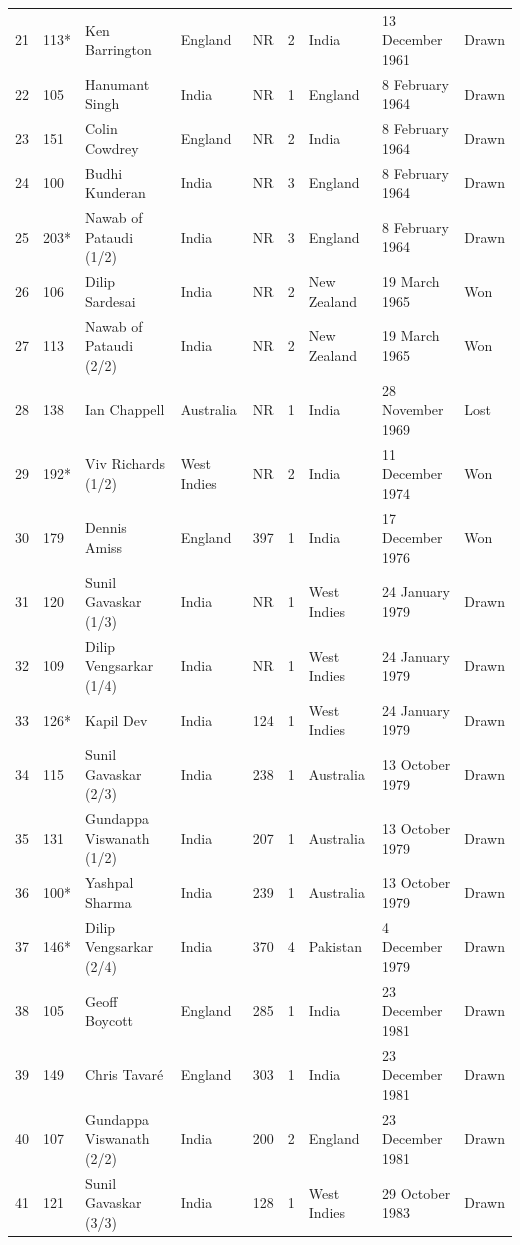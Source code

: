 \documentclass{article}
\begin{document}
\begin{tabular}{lllllllll}
21 & 113* & Ken Barrington & England & NR & 2 & India & 13 December 1961 & Drawn \\
22 & 105 & Hanumant Singh & India & NR & 1 & England & 8 February 1964 & Drawn \\
23 & 151 & Colin Cowdrey & England & NR & 2 & India & 8 February 1964 & Drawn \\
24 & 100 & Budhi Kunderan & India & NR & 3 & England & 8 February 1964 & Drawn \\
25 & 203* & Nawab of Pataudi (1/2) & India & NR & 3 & England & 8 February 1964 & Drawn \\
26 & 106 & Dilip Sardesai & India & NR & 2 & New Zealand & 19 March 1965 & Won \\
27 & 113 & Nawab of Pataudi (2/2) & India & NR & 2 & New Zealand & 19 March 1965 & Won \\
28 & 138 & Ian Chappell & Australia & NR & 1 & India & 28 November 1969 & Lost \\
29 & 192* & Viv Richards (1/2) & West Indies & NR & 2 & India & 11 December 1974 & Won \\
30 & 179 & Dennis Amiss & England & 397 & 1 & India & 17 December 1976 & Won \\
31 & 120 & Sunil Gavaskar (1/3) & India & NR & 1 & West Indies & 24 January 1979 & Drawn \\
32 & 109 & Dilip Vengsarkar (1/4) & India & NR & 1 & West Indies & 24 January 1979 & Drawn \\
33 & 126* & Kapil Dev & India & 124 & 1 & West Indies & 24 January 1979 & Drawn \\
34 & 115 & Sunil Gavaskar (2/3) & India & 238 & 1 & Australia & 13 October 1979 & Drawn \\
35 & 131 & Gundappa Viswanath (1/2) & India & 207 & 1 & Australia & 13 October 1979 & Drawn \\
36 & 100* & Yashpal Sharma & India & 239 & 1 & Australia & 13 October 1979 & Drawn \\
37 & 146* & Dilip Vengsarkar (2/4) & India & 370 & 4 & Pakistan & 4 December 1979 & Drawn \\
38 & 105 & Geoff Boycott & England & 285 & 1 & India & 23 December 1981 & Drawn \\
39 & 149 & Chris Tavaré & England & 303 & 1 & India & 23 December 1981 & Drawn \\
40 & 107 & Gundappa Viswanath (2/2) & India & 200 & 2 & England & 23 December 1981 & Drawn \\
41 & 121 & Sunil Gavaskar (3/3) & India & 128 & 1 & West Indies & 29 October 1983 & Drawn \\

\end{tabular}
\end{document}
